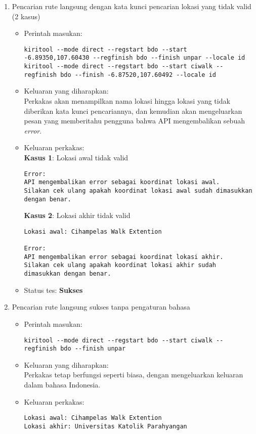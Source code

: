 \begin{enumerate}
	\item Pencarian rute langsung dengan kata kunci pencarian lokasi yang tidak valid (2 kasus)
	\begin{itemize}
		\item Perintah masukan:
		\begin{lstlisting}
kiritool --mode direct --regstart bdo --start -6.89350,107.60430 --regfinish bdo --finish unpar --locale id
kiritool --mode direct --regstart bdo --start ciwalk --regfinish bdo --finish -6.87520,107.60492 --locale id
		\end{lstlisting}
		\item Keluaran yang diharapkan: \\
		Perkakas akan menampilkan nama lokasi hingga lokasi yang tidak diberikan kata kunci pencariannya, dan kemudian akan mengeluarkan pesan yang memberitahu pengguna bahwa API mengembalikan sebuah \textit{error}.
		\item Keluaran perkakas: \\
		\textbf{Kasus 1}: Lokasi awal tidak valid
		\begin{lstlisting}
Error:
API mengembalikan error sebagai koordinat lokasi awal.
Silakan cek ulang apakah koordinat lokasi awal sudah dimasukkan dengan benar.
		\end{lstlisting}
		\textbf{Kasus 2}: Lokasi akhir tidak valid
		\begin{lstlisting}
Lokasi awal: Cihampelas Walk Extention

Error:
API mengembalikan error sebagai koordinat lokasi akhir.
Silakan cek ulang apakah koordinat lokasi akhir sudah dimasukkan dengan benar.
		\end{lstlisting}
		\item Status tes: \textbf{Sukses}
	\end{itemize}
	
	\item Pencarian rute langsung sukses tanpa pengaturan bahasa
	\begin{itemize}
		\item Perintah masukan:
		\begin{lstlisting}
kiritool --mode direct --regstart bdo --start ciwalk --regfinish bdo --finish unpar
		\end{lstlisting}
		\item Keluaran yang diharapkan: \\
		Perkakas tetap berfungsi seperti biasa, dengan mengeluarkan keluaran dalam bahasa Indonesia.
		\item Keluaran perkakas:
		\begin{lstlisting}
Lokasi awal: Cihampelas Walk Extention
Lokasi akhir: Universitas Katolik Parahyangan


\end{lstlisting}
\end{itemize}
\end{enumerate}
